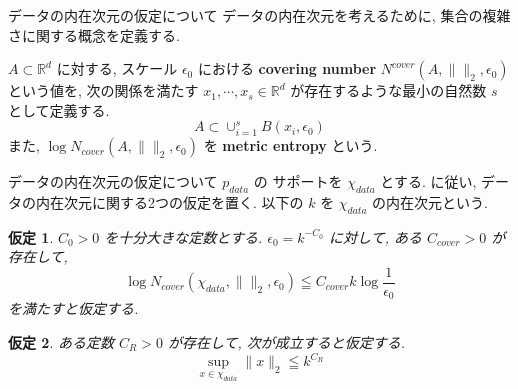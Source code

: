 \documentclass[11pt]{beamer}
\theoremstyle{plain}
\newtheorem{assumption}{仮定}
\theoremstyle{definition}
\renewcommand{\cite}[1]{\citep{#1}}
\begin{document}
    \begin{frame}{データの内在次元の仮定について}
      データの内在次元を考えるために, 集合の複雑さに関する概念を定義する.
      \begin{definition}
        $A\subset \mathbb{R}^d$ に対する, スケール $\epsilon_0$ における \textbf{covering number} $N^{cover}(A,\|\|_2,\epsilon_0)$ という値を, 次の関係を満たす $x_1,\cdots, x_s \in \mathbb{R}^d$ 
        が存在するような最小の自然数 $s$ として定義する.
        \begin{equation}
          A\subset \cup_{i=1}^sB(x_i,\epsilon_0)
        \end{equation}
        また, $\log{N_{cover}(A,\|\|_2,\epsilon_0)}$ を \textbf{metric entropy} という.
      \end{definition}
    \end{frame}
    \begin{frame}{データの内在次元の仮定について}
      $p_{data}$ の サポートを $\chi_{data}$ とする.
      \cite{li_yan_2024_low_dimensional,huang_wei_chen_2026} に従い, データの内在次元に関する2つの仮定を置く. 以下の $k$ を $\chi_{data}$ の内在次元という.
      \begin{assumption}
        $C_0 > 0$ を十分大きな定数とする. $\epsilon_0=k^{-C_0}$ に対して, ある $C_{cover}>0$ が存在して, 
        \begin{equation}
          \log{N_{cover}(\chi_{data},\|\|_2,\epsilon_0)}\leqq C_{cover}k\log{\frac{1}{\epsilon_0}}
        \end{equation}
        を満たすと仮定する.
      \end{assumption}
      \begin{assumption}
        ある定数 $C_R>0$ が存在して, 次が成立すると仮定する.
        \begin{equation}
          \sup\limits_{x\in \chi_{data}}\|x\|_2\leqq k^{C_R}
        \end{equation}
      \end{assumption}
    \end{frame}
\end{document}

